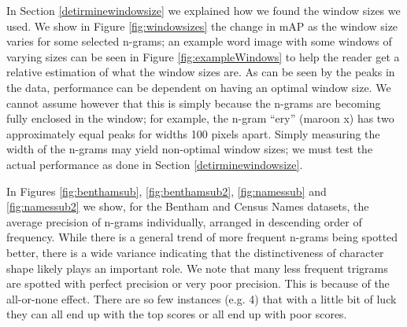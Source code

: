 \documentclass[ms,electronic,twosidetoc,letterpaper,chaptercenter,parttop,lof,lot]{byumsphd}
\begin{document}
In Section \ref{detirminewindowsize} we explained how we found the window sizes we used. We show in Figure \ref{fig:windowsizes} the change in mAP as the window size varies for some selected n-grams; an example word image with some windows of varying sizes can be seen in Figure \ref{fig:exampleWindows} to help the reader get a relative estimation of what the window sizes are. As can be seen by the peaks in the data, performance can be dependent on having an optimal window size. We cannot assume however that this is simply because the n-grams are becoming fully enclosed in the window; for example, the n-gram ``ery'' (maroon x) has two approximately equal peaks for widths 100 pixels apart. Simply measuring the width of the n-grams may yield non-optimal window sizes; we must test the actual performance as done in Section \ref{detirminewindowsize}.



In Figures \ref{fig:benthamsub}, \ref{fig:benthamsub2}, \ref{fig:namessub} and \ref{fig:namessub2} we show, for the Bentham and Census Names datasets, the average precision of n-grams individually, arranged in descending order of frequency. While there is a general trend of more frequent n-grams being spotted better, there is a wide variance indicating that the distinctiveness of character shape likely plays an important role. We note that many less frequent trigrams are spotted with perfect precision or very poor precision. This is because of the all-or-none effect. There are so few instances (e.g. 4) that with a little bit of luck they can all end up with the top scores or all end up with poor scores.
\end{document}
